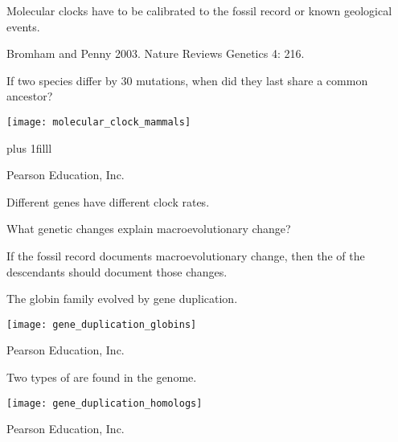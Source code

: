 \documentclass[t,handout]{beamer}  %
\begin{document}
%
{
\begin{frame}[b]{Molecular clocks have to be calibrated to the fossil record or known geological events.}

\hfill \tiny Bromham and Penny 2003. Nature Reviews Genetics 4: 216.
\end{frame}
}
%
\begin{frame}[t]{If two species differ by 30 mutations, when did they last share a common ancestor?}

	\texttt{[image: molecular\_clock\_mammals]}
	

	\vskip0pt plus 1filll
	
	\hfill \tiny \textcopyright Pearson Education, Inc.
\end{frame}
%
{
\begin{frame}[b]{Different genes have different clock rates.}

\end{frame}
}
%
\begin{frame}{What genetic changes explain macroevolutionary change?}

	\hangpara If the fossil record documents macroevolutionary change, 
	then the  of the descendants should document those changes.
	 
\end{frame}
%
{
\begin{frame}[b]
\end{frame}
}
%
\begin{frame}{The globin family evolved by gene duplication.}

	\centering\texttt{[image: gene\_duplication\_globins]}
	 
	 \vfilll
	 
	 \hfill \tiny \textcopyright Pearson Education, Inc.
\end{frame}
%
\begin{frame}{Two types of  are found in the genome.}

	\texttt{[image: gene\_duplication\_homologs]}
	 
	 \vfilll
	 
	 \hfill \tiny \textcopyright Pearson Education, Inc.
\end{frame}
\end{document}
